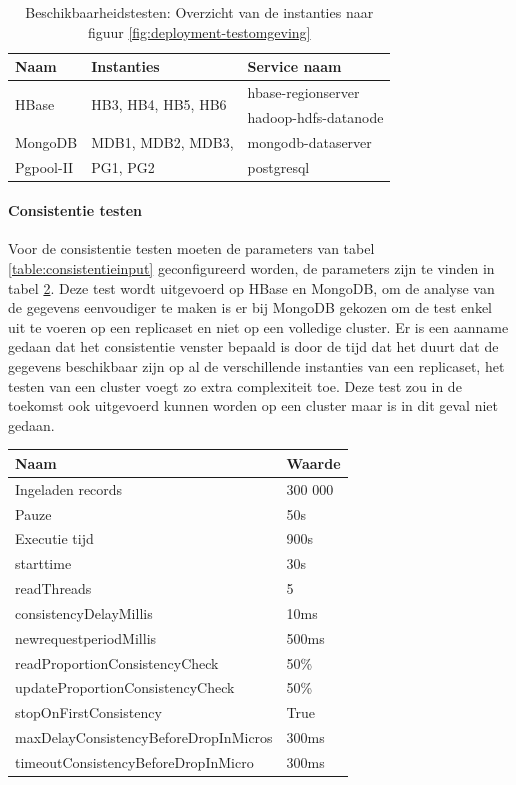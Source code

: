 \begin{table}[ht!]
	\centering
	\begin{tabular}{l| l l }
		\textbf{Naam} & \textbf{Instanties} & \textbf{Service naam} \\
		\hline
		\multirow{2}{*}{HBase}  & \multirow{2}{*}{HB3, HB4, HB5, HB6} & hbase-regionserver \\
		& & hadoop-hdfs-datanode \\
		MongoDB  & MDB1, MDB2, MDB3, & mongodb-dataserver\\
		Pgpool-II  & PG1, PG2 & postgresql \\
	\end{tabular}
	\caption{Beschikbaarheidstesten: Overzicht van de instanties naar figuur \ref{fig:deployment-testomgeving}}
	\label{table:beschikbaarheidstesten-nodes}
\end{table}

\paragraph{Consistentie testen} Voor de consistentie testen moeten de parameters van tabel \ref{table:consistentieinput} geconfigureerd worden, de parameters zijn te vinden in tabel \ref{table:consistentie-testen-parameters}. Deze test wordt uitgevoerd op HBase en MongoDB, om de analyse van de gegevens eenvoudiger te maken is er bij MongoDB gekozen om de test enkel uit te voeren op een replicaset en niet op een volledige cluster. Er is een aanname gedaan dat het consistentie venster bepaald is door de tijd dat het duurt dat de gegevens beschikbaar zijn op al de verschillende instanties van een replicaset, het testen van een cluster voegt zo extra complexiteit toe. Deze test zou in de toekomst ook uitgevoerd kunnen worden op een cluster maar is in dit geval niet gedaan.  

\begin{table}[htb!]
	\centering
		\begin{tabular}{l|l}
			\textbf{Naam} & \textbf{Waarde} \\ \hline
			Ingeladen records  & 300 000 \\
			Pauze & 50s \\
			Executie tijd & 900s \\	
			starttime & 30s \\
			readThreads & 5 \\ 
			consistencyDelayMillis & 10ms \\ 
			newrequestperiodMillis & 500ms \\ 
			readProportionConsistencyCheck & 50\% \\ 
			updateProportionConsistencyCheck & 50\% \\ 
			stopOnFirstConsistency & True \\ 
			maxDelayConsistencyBeforeDropInMicros & 300ms \\ 
			timeoutConsistencyBeforeDropInMicro & 300ms \\
		\end{tabular} 
	\label{table:consistentie-testen-parameters}
\end{table}

